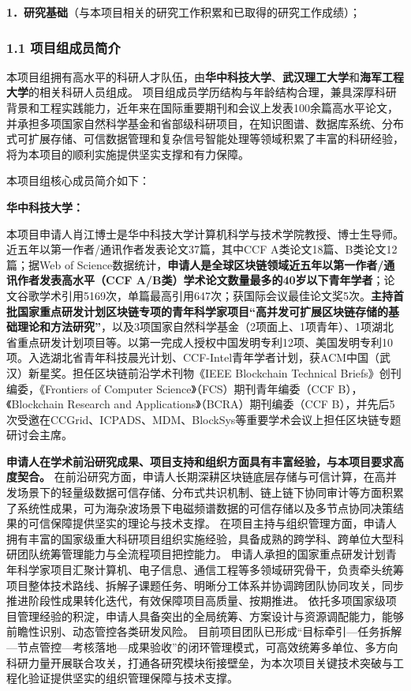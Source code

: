 {\sihao \kaishu \color{MsBlue}
\textbf{1．研究基础}（与本项目相关的研究工作积累和已取得的研究工作成绩）；
}

\subsubsection{1.1 项目组成员简介}

{\kaishu

本项目组拥有高水平的科研人才队伍，由\textbf{华中科技大学}、\textbf{武汉理工大学}和\textbf{海军工程大学}的相关科研人员组成。
项目组成员学历结构与年龄结构合理，兼具深厚科研背景和工程实践能力，近年来在国际重要期刊和会议上发表100余篇高水平论文，并承担多项国家自然科学基金和省部级科研项目，在知识图谱、数据库系统、分布式可扩展存储、可信数据管理和复杂信号智能处理等领域积累了丰富的科研经验，将为本项目的顺利实施提供坚实支撑和有力保障。

本项目组核心成员简介如下：

\textbf{华中科技大学：}

本项目申请人肖江博士是华中科技大学计算机科学与技术学院教授、博士生导师。近五年以第一作者/通讯作者发表论文37篇，其中CCF A类论文18篇、B类论文12篇；据Web of Science数据统计，\textbf{申请人是全球区块链领域近五年以第一作者/通讯作者发表高水平（CCF A/B类）学术论文数量最多的40岁以下青年学者}；论文谷歌学术引用5169次，单篇最高引用647次；获国际会议最佳论文奖5次。\textbf{主持首批国家重点研发计划区块链专项的青年科学家项目“高并发可扩展区块链存储的基础理论和方法研究”}，以及3项国家自然科学基金（2项面上、1项青年）、1项湖北省重点研发计划项目等。以第一完成人授权中国发明专利12项、美国发明专利10项。入选湖北省青年科技晨光计划、CCF-Intel青年学者计划，获ACM中国（武汉）新星奖。担任区块链前沿学术刊物《IEEE Blockchain Technical Briefs》创刊编委，《Frontiers of Computer Science》（FCS）期刊青年编委（CCF B），《Blockchain Research and Applications》（BCRA）期刊编委（CCF B），并先后5次受邀在CCGrid、ICPADS、MDM、BlockSys等重要学术会议上担任区块链专题研讨会主席。

\textbf{申请人在学术前沿研究成果、项目支持和组织方面具有丰富经验，与本项目要求高度契合。}
在前沿研究方面，申请人长期深耕区块链底层存储与可信计算，在高并发场景下的轻量级数据可信存储、分布式共识机制、链上链下协同审计等方面积累了系统性成果，可为海杂波场景下电磁频谱数据的可信存储以及多节点协同决策结果的可信保障提供坚实的理论与技术支撑。
在项目主持与组织管理方面，申请人拥有丰富的国家级重大科研项目组织实施经验，具备成熟的跨学科、跨单位大型科研团队统筹管理能力与全流程项目把控能力。
申请人承担的国家重点研发计划青年科学家项目汇聚计算机、电子信息、通信工程等多领域研究骨干，负责牵头统筹项目整体技术路线、拆解子课题任务、明晰分工体系并协调跨团队协同攻关，同步推进阶段性成果转化迭代，有效保障项目高质量、按期推进。
依托多项国家级项目管理经验的积淀，申请人具备突出的全局统筹、方案设计与资源调配能力，能够前瞻性识别、动态管控各类研发风险。
目前项目团队已形成“目标牵引—任务拆解—节点管控—考核落地—成果验收”的闭环管理模式，可高效统筹多单位、多方向科研力量开展联合攻关，打通各研究模块衔接壁垒，为本次项目关键技术突破与工程化验证提供坚实的组织管理保障与技术支撑。

}
